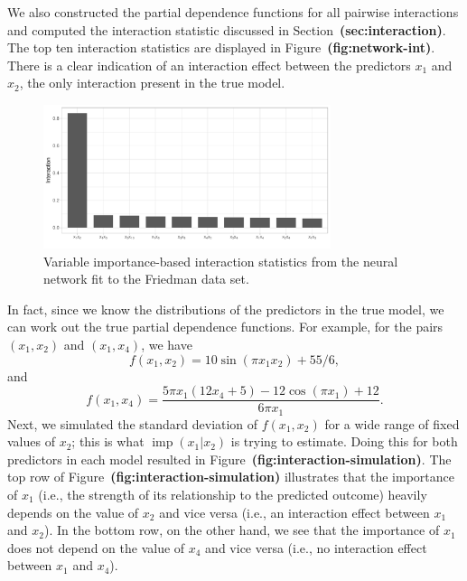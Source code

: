 \documentclass[12pt]{article}
\def\ref#1{\textbf{(#1)}}
\DeclareMathOperator{\imp}{imp}
\begin{document}
We also constructed the partial dependence functions for all pairwise interactions and computed the interaction statistic discussed in Section~\ref{sec:interaction}. The top ten interaction statistics are displayed in Figure~\ref{fig:network-int}. There is a clear indication of an interaction effect between the predictors $x_1$ and $x_2$, the only interaction present in the true model.

\begin{figure}[!htb]
  \centering
  \includegraphics[width=0.75\textwidth]{network-int}
  \caption{Variable importance-based interaction statistics from the neural network fit to the Friedman data set. \label{fig:network-int}}
\end{figure}

In fact, since we know the distributions of the predictors in the true model, we can work out the true partial dependence functions. For example, for the pairs $\left(x_1, x_2\right)$ and $\left(x_1, x_4\right)$, we have
\begin{equation*}
f\left(x_1, x_2\right) = 10 \sin \left(\pi x_1 x_2\right) + 55 / 6,
\end{equation*}
and 
\begin{equation*}
f\left(x_1, x_4\right) = \frac{5 \pi x_1 \left(12 x_4 + 5\right) - 12 \cos \left(\pi x_1\right) + 12}{6 \pi x_1}.
\end{equation*}
Next, we simulated the standard deviation of $f\left(x_1, x_2\right)$ for a wide range of fixed values of $x_2$; this is what $\imp\left(x_1 | x_2\right)$ is trying to estimate. Doing this for both predictors in each model resulted in Figure~\ref{fig:interaction-simulation}. The top row of Figure~\ref{fig:interaction-simulation} illustrates that the importance of $x_1$ (i.e., the strength of its relationship to the predicted outcome) heavily depends on the value of $x_2$ and vice versa (i.e., an interaction effect between $x_1$ and $x_2$). In the bottom row, on the other hand, we see that the importance of $x_1$ does not depend on the value of $x_4$ and vice versa (i.e., no interaction effect between $x_1$ and $x_4$).
\end{document}
